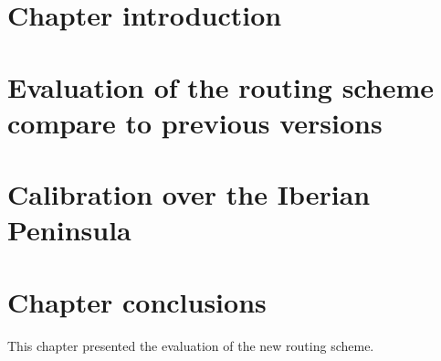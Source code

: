 \section{Chapter introduction}

\section{Evaluation of the routing scheme compare to previous versions}

\section{Calibration over the Iberian Peninsula}

\section{Chapter conclusions}
This chapter presented the evaluation of the new routing scheme.